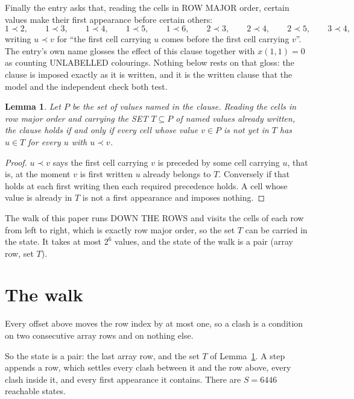 \documentclass[11pt,a4paper]{article}
\theoremstyle{plain}
\newtheorem{lemma}[theorem]{Lemma}
\theoremstyle{definition}
\begin{document}
Finally the entry asks that, reading the cells in ROW MAJOR order, certain values make their
first appearance before certain others:
\[
1\prec 2,\qquad 1\prec 3,\qquad 1\prec 4,\qquad 1\prec 5,\qquad 1\prec 6,\qquad 2\prec 3,\qquad 2\prec 4,\qquad 2\prec 5,\qquad 3\prec 4 ,
\]
writing $u\prec v$ for ``the first cell carrying $u$ comes before the first cell carrying
$v$''. The entry's own name glosses the effect of this clause together with $x(1,1)=0$ as
counting UNLABELLED colourings. Nothing below rests on that gloss: the clause is imposed
exactly as it is written, and it is the written clause that the model and the independent
check both test.

\begin{lemma}\label{lem:seen}
Let $P$ be the set of values named in the clause. Reading the cells in row major order and
carrying the SET $T\subseteq P$ of named values already written, the clause holds if and only
if every cell whose value $v\in P$ is not yet in $T$ has $u\in T$ for every $u$ with $u\prec v$.
\end{lemma}

\begin{proof}
$u\prec v$ says the first cell carrying $v$ is preceded by some cell carrying $u$, that is, at
the moment $v$ is first written $u$ already belongs to $T$. Conversely if that holds at each
first writing then each required precedence holds. A cell whose value is already in $T$ is not
a first appearance and imposes nothing.
\end{proof}

The walk of this paper runs DOWN THE ROWS and visits the cells of each row from left to right,
which is exactly row major order, so the set $T$ can be carried in the state. It takes at most
$2^{6}$ values, and the state of the walk is a pair (array row, set $T$).

\section{The walk}

Every offset above moves the row index by at most one, so a clash is a condition on two
consecutive array rows and on nothing else.

So the state is a pair: the last array row, and the set $T$ of Lemma~\ref{lem:seen}. A step
appends a row, which settles every clash between it and the row above, every clash inside it,
and every first appearance it contains. There are $S=6446$ reachable states.
\end{document}
